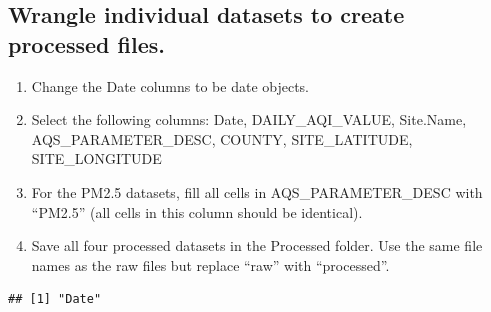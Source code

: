 \documentclass[
]{article}
\newenvironment{Shaded}{\begin{snugshade}}{\end{snugshade}}
\newcommand{\AttributeTok}[1]{\textcolor[rgb]{0.13,0.29,0.53}{#1}}
\newcommand{\CommentTok}[1]{\textcolor[rgb]{0.56,0.35,0.01}{\textit{#1}}}
\newcommand{\FunctionTok}[1]{\textcolor[rgb]{0.13,0.29,0.53}{\textbf{#1}}}
\newcommand{\NormalTok}[1]{#1}
\newcommand{\OtherTok}[1]{\textcolor[rgb]{0.56,0.35,0.01}{#1}}
\newcommand{\SpecialCharTok}[1]{\textcolor[rgb]{0.81,0.36,0.00}{\textbf{#1}}}
\newcommand{\StringTok}[1]{\textcolor[rgb]{0.31,0.60,0.02}{#1}}
\begin{document}
\subsection{Wrangle individual datasets to create processed
files.}\label{wrangle-individual-datasets-to-create-processed-files.}

\begin{enumerate}
\def\labelenumi{\arabic{enumi}.}
\setcounter{enumi}{2}
\item
  Change the Date columns to be date objects.
\item
  Select the following columns: Date, DAILY\_AQI\_VALUE, Site.Name,
  AQS\_PARAMETER\_DESC, COUNTY, SITE\_LATITUDE, SITE\_LONGITUDE
\item
  For the PM2.5 datasets, fill all cells in AQS\_PARAMETER\_DESC with
  ``PM2.5'' (all cells in this column should be identical).
\item
  Save all four processed datasets in the Processed folder. Use the same
  file names as the raw files but replace ``raw'' with ``processed''.
\end{enumerate}

\begin{Shaded}
\end{Shaded}

\begin{verbatim}
## [1] "Date"
\end{verbatim}

\begin{Shaded}
\end{Shaded}
\end{document}
